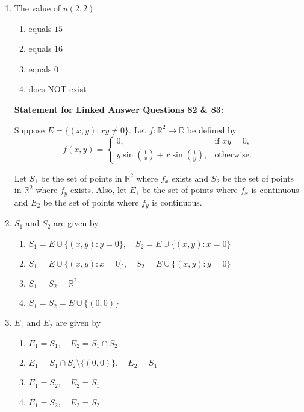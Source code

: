 \documentclass[journal]{IEEEtran}
\numberwithin{equation}{enumi}
\numberwithin{figure}{enumi}
\begin{document}
\begin{enumerate}
\item The value of $u(2,2)$         \hfill{}
\begin{enumerate}
    \item equals $15$
    \item equals $16$
    \item equals $0$
    \item does NOT exist
\end{enumerate}

\newpage

\textbf{Statement for Linked Answer Questions 82 \& 83:}

Suppose $E = \{(x, y): xy \ne 0\}$. Let $f: \mathbb{R}^2 \rightarrow \mathbb{R}$ be defined by  
\[
f(x, y) =
\begin{cases}
0, & \text{if } xy = 0, \\
y \sin\left(\frac{1}{x}\right) + x \sin\left(\frac{1}{y}\right), & \text{otherwise}.
\end{cases}
\]

Let $S_1$ be the set of points in $\mathbb{R}^2$ where $f_x$ exists and $S_2$ be the set of points in $\mathbb{R}^2$ where $f_y$ exists. Also, let $E_1$ be the set of points where $f_x$ is continuous and $E_2$ be the set of points where $f_y$ is continuous.

\item $S_1$ and $S_2$ are given by      \hfill{}
\begin{enumerate}
    \item $S_1 = E \cup \{(x, y): y = 0\},\quad S_2 = E \cup \{(x, y): x = 0\}$
    \item $S_1 = E \cup \{(x, y): x = 0\},\quad S_2 = E \cup \{(x, y): y = 0\}$
    \item $S_1 = S_2 = \mathbb{R}^2$
    \item $S_1 = S_2 = E \cup \{(0, 0)\}$
\end{enumerate}




\item $E_1$ and $E_2$ are given by      \hfill{}

\begin{enumerate}
    \item $E_1 = S_1,\quad E_2 = S_1 \cap S_2$
    \item $E_1 = S_1 \cap S_2 \setminus \{(0,0)\},\quad E_2 = S_1$
    \item $E_1 = S_2,\quad E_2 = S_1$
    \item $E_1 = S_2,\quad E_2 = S_2$
\end{enumerate}


\end{enumerate}
\end{document}
